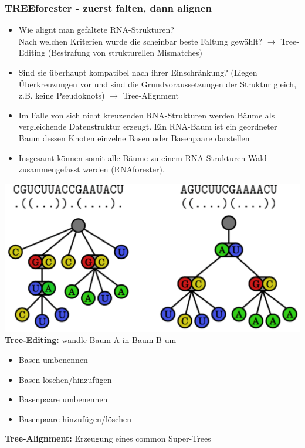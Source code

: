 \subsubsection{TREEforester - zuerst falten, dann alignen}
\begin{itemize}
\item Wie alignt man gefaltete RNA-Strukturen? \\
Nach welchen Kriterien wurde die scheinbar beste Faltung gewählt? $\rightarrow$ Tree-Editing (Bestrafung von strukturellen Mismatches)
\item Sind sie überhaupt kompatibel nach ihrer Einschränkung? (Liegen Überkreuzungen vor und sind die Grundvoraussetzungen der Struktur gleich, z.B. keine Pseudoknots) $\rightarrow$ Tree-Alignment
\item Im Falle von sich nicht kreuzenden RNA-Strukturen werden Bäume als vergleichende Datenstruktur erzeugt. Ein RNA-Baum ist ein geordneter Baum dessen Knoten einzelne Basen oder Basenpaare darstellen
\item Insgesamt können somit alle Bäume zu einem RNA-Strukturen-Wald zusammengefasst werden (RNAforester). \\
\end{itemize}
\includegraphics[scale=0.5]{lectures/160509/pix/Baeume.pdf} \\

\textbf{Tree-Editing:} wandle Baum A in Baum B um
\begin{itemize}
\item Basen umbenennen
\item Basen löschen/hinzufügen
\item Basenpaare umbenennen
\item Basenpaare hinzufügen/löschen
\end{itemize}

\textbf{Tree-Alignment:} Erzeugung eines common Super-Trees

